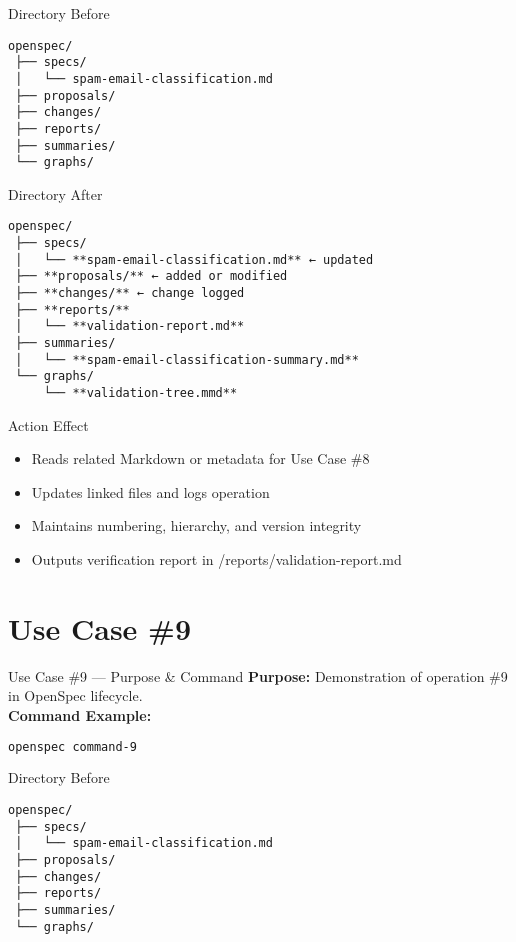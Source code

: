 \documentclass[aspectratio=169]{beamer}
\begin{document}
\begin{frame}{Directory Before}
\begin{lstlisting}
openspec/
 ├── specs/
 │   └── spam-email-classification.md
 ├── proposals/
 ├── changes/
 ├── reports/
 ├── summaries/
 └── graphs/
\end{lstlisting}
\end{frame}

\begin{frame}{Directory After}
\begin{lstlisting}
openspec/
 ├── specs/
 │   └── **spam-email-classification.md** ← updated
 ├── **proposals/** ← added or modified
 ├── **changes/** ← change logged
 ├── **reports/**
 │   └── **validation-report.md**
 ├── summaries/
 │   └── **spam-email-classification-summary.md**
 └── graphs/
     └── **validation-tree.mmd**
\end{lstlisting}
\end{frame}

\begin{frame}{Action Effect}
\begin{itemize}
  \item Reads related Markdown or metadata for Use Case \#8
  \item Updates linked files and logs operation
  \item Maintains numbering, hierarchy, and version integrity
  \item Outputs verification report in /reports/validation-report.md
\end{itemize}
\end{frame}

\section*{Use Case \#9}
\begin{frame}{Use Case \#9 --- Purpose \& Command}
\textbf{Purpose:} Demonstration of operation \#9 in OpenSpec lifecycle.\\[4pt]
\textbf{Command Example:}
\begin{lstlisting}[language=bash]
openspec command-9
\end{lstlisting}
\end{frame}

\begin{frame}{Directory Before}
\begin{lstlisting}
openspec/
 ├── specs/
 │   └── spam-email-classification.md
 ├── proposals/
 ├── changes/
 ├── reports/
 ├── summaries/
 └── graphs/
\end{lstlisting}
\end{frame}
\end{document}
